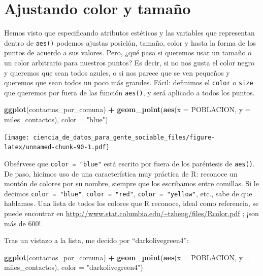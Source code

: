 \documentclass[]{book}
\newenvironment{Shaded}{\begin{snugshade}}{\end{snugshade}}
\newcommand{\KeywordTok}[1]{\textcolor[rgb]{0.13,0.29,0.53}{\textbf{#1}}}
\newcommand{\DataTypeTok}[1]{\textcolor[rgb]{0.13,0.29,0.53}{#1}}
\newcommand{\StringTok}[1]{\textcolor[rgb]{0.31,0.60,0.02}{#1}}
\newcommand{\OperatorTok}[1]{\textcolor[rgb]{0.81,0.36,0.00}{\textbf{#1}}}
\newcommand{\NormalTok}[1]{#1}
\begin{document}
\section{Ajustando color y tamaño}\label{ajustando-color-y-tamano}

Hemos visto que especificando atributos estéticos y las variables que
representan dentro de \texttt{aes()} podemos ajustas posición, tamaño,
color y hasta la forma de los puntos de acuerdo a sus valores. Pero,
¿qué pasa si queremos usar un tamaño o un color arbitrario para nuestros
puntos? Es decir, si no nos gusta el color negro y queremos que sean
todos azules, o si nos parece que se ven pequeños y queremos que sean
todos un poco más grandes. Fácil: definimos el \texttt{color} o
\texttt{size} que queremos por fuera de las función \texttt{aes()}, y
será aplicado a todos los puntos.

\begin{Shaded}
\begin{Highlighting}[]
\KeywordTok{ggplot}\NormalTok{(contactos_por_comuna) }\OperatorTok{+}\StringTok{ }
\StringTok{    }\KeywordTok{geom_point}\NormalTok{(}\KeywordTok{aes}\NormalTok{(}\DataTypeTok{x =}\NormalTok{ POBLACION, }\DataTypeTok{y =}\NormalTok{ miles_contactos), }\DataTypeTok{color =} \StringTok{"blue"}\NormalTok{)}
\end{Highlighting}
\end{Shaded}

\texttt{[image: ciencia\_de\_datos\_para\_gente\_sociable\_files/figure-latex/unnamed-chunk-90-1.pdf]}

Obsérvese que \texttt{color\ =\ "blue"} está escrito por fuera de los
paréntesis de \texttt{aes()}. De paso, hicimos uso de una característica
muy práctica de R: reconoce un montón de colores por su nombre, siempre
que los escribamos entre comillas. Si le decimos
\texttt{color\ =\ "blue"}, \texttt{color\ =\ "red"},
\texttt{color\ =\ "yellow"}, etc., sabe de que hablamos. Una lista de
todos los colores que R reconoce, ideal como referencia, se puede
encontrar en \url{http://www.stat.columbia.edu/~tzheng/files/Rcolor.pdf}
; ¡son más de 600!.

Tras un vistazo a la lista, me decido por ``darkolivegreen4'':

\begin{Shaded}
\begin{Highlighting}[]
\KeywordTok{ggplot}\NormalTok{(contactos_por_comuna) }\OperatorTok{+}\StringTok{ }
\StringTok{    }\KeywordTok{geom_point}\NormalTok{(}\KeywordTok{aes}\NormalTok{(}\DataTypeTok{x =}\NormalTok{ POBLACION, }\DataTypeTok{y =}\NormalTok{ miles_contactos), }\DataTypeTok{color =} \StringTok{"darkolivegreen4"}\NormalTok{)}
\end{Highlighting}
\end{Shaded}
\end{document}
